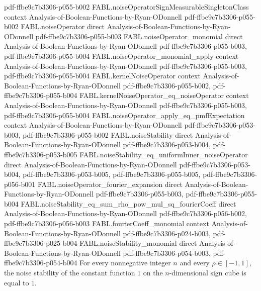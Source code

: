 \begin{theorem}
  {pdf-ffbe9c7b3306-p055-b002}
\proofstep
  {FABL.noiseOperatorSignMeasurableSingletonClass}
  {context}
  {Analysis-of-Boolean-Functions-by-Ryan-ODonnell}
  {pdf-ffbe9c7b3306-p055-b002}
\proofstep
  {FABL.noiseOperator}
  {direct}
  {Analysis-of-Boolean-Functions-by-Ryan-ODonnell}
  {pdf-ffbe9c7b3306-p055-b003}
\proofstep
  {FABL.noiseOperator_monomial}
  {direct}
  {Analysis-of-Boolean-Functions-by-Ryan-ODonnell}
  {pdf-ffbe9c7b3306-p055-b003,
    pdf-ffbe9c7b3306-p055-b004}
\proofstep
  {FABL.noiseOperator_monomial_apply}
  {context}
  {Analysis-of-Boolean-Functions-by-Ryan-ODonnell}
  {pdf-ffbe9c7b3306-p055-b003,
    pdf-ffbe9c7b3306-p055-b004}
\proofstep
  {FABL.kernelNoiseOperator}
  {context}
  {Analysis-of-Boolean-Functions-by-Ryan-ODonnell}
  {pdf-ffbe9c7b3306-p055-b002,
    pdf-ffbe9c7b3306-p055-b004}
\proofstep
  {FABL.kernelNoiseOperator_eq_noiseOperator}
  {context}
  {Analysis-of-Boolean-Functions-by-Ryan-ODonnell}
  {pdf-ffbe9c7b3306-p055-b003,
    pdf-ffbe9c7b3306-p055-b004}
\proofstep
  {FABL.noiseOperator_apply_eq_pmfExpectation}
  {context}
  {Analysis-of-Boolean-Functions-by-Ryan-ODonnell}
  {pdf-ffbe9c7b3306-p053-b003,
    pdf-ffbe9c7b3306-p055-b002}
\proofstep
  {FABL.noiseStability}
  {direct}
  {Analysis-of-Boolean-Functions-by-Ryan-ODonnell}
  {pdf-ffbe9c7b3306-p053-b004,
    pdf-ffbe9c7b3306-p053-b005}
\proofstep
  {FABL.noiseStability_eq_uniformInner_noiseOperator}
  {direct}
  {Analysis-of-Boolean-Functions-by-Ryan-ODonnell}
  {pdf-ffbe9c7b3306-p053-b004,
    pdf-ffbe9c7b3306-p053-b005,
    pdf-ffbe9c7b3306-p055-b005,
    pdf-ffbe9c7b3306-p056-b001}
\proofstep
  {FABL.noiseOperator_fourier_expansion}
  {direct}
  {Analysis-of-Boolean-Functions-by-Ryan-ODonnell}
  {pdf-ffbe9c7b3306-p055-b003,
    pdf-ffbe9c7b3306-p055-b004}
\proofstep
  {FABL.noiseStability_eq_sum_rho_pow_mul_sq_fourierCoeff}
  {direct}
  {Analysis-of-Boolean-Functions-by-Ryan-ODonnell}
  {pdf-ffbe9c7b3306-p056-b002,
    pdf-ffbe9c7b3306-p056-b003}
\proofstep
  {FABL.fourierCoeff_monomial}
  {context}
  {Analysis-of-Boolean-Functions-by-Ryan-ODonnell}
  {pdf-ffbe9c7b3306-p024-b003,
    pdf-ffbe9c7b3306-p025-b004}
\proofstep
  {FABL.noiseStability_monomial}
  {direct}
  {Analysis-of-Boolean-Functions-by-Ryan-ODonnell}
  {pdf-ffbe9c7b3306-p054-b003,
    pdf-ffbe9c7b3306-p054-b004}
For every nonnegative integer $n$ and every $\rho\in[-1,1]$, the noise stability of the
constant function $1$ on the $n$-dimensional sign cube is equal to $1$.
\end{theorem}

